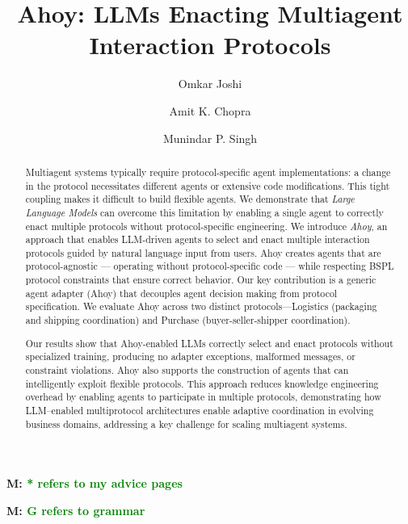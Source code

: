 \documentclass[runningheads]{llncs}
\newcommand{\mps}[1]{\textbf{M: \textcolor{green}{#1}}\newline}
\newcounter{mpscount}
\newcounter{akccount}
\DeclareRobustCommand{\mps}[1]{\stepcounter{mpscount}\textcolor{blue!60!black}{\textsf{MPS \thempscount: #1}}}
\DeclareRobustCommand{\akc}[1]{\stepcounter{akccount}\textcolor{red}{\textsf{AKC \theakccount: #1}}}
\newcommand{\ahoy}{Ahoy\xspace}
\begin{document}
%
\title{\ahoy: LLMs Enacting Multiagent Interaction Protocols}
%
\titlerunning{\ahoy}

\author{Omkar Joshi \and
Amit K. Chopra \and
Munindar P. Singh}
%


\maketitle

\mps{* refers to my advice pages}

\mps{G refers to grammar}

\begin{abstract}
Multiagent systems typically require protocol-specific agent implementations: a change in the protocol necessitates different agents or extensive code modifications.
This tight coupling makes it difficult to build flexible agents.
We demonstrate that \emph{Large Language Models} can overcome this limitation by enabling a single agent to correctly enact multiple protocols without protocol-specific engineering.
We introduce \emph{\ahoy}, an approach that enables LLM-driven agents to select and enact multiple interaction protocols guided by natural language input from users. 
\ahoy creates agents that are protocol-agnostic --- operating without protocol-specific code --- while respecting BSPL protocol constraints that ensure correct behavior.
Our key contribution is a generic agent adapter ({\ahoy}) that decouples agent decision making from protocol specification. 
We evaluate \ahoy across two distinct protocols---Logistics (packaging and shipping coordination) and Purchase (buyer-seller-shipper coordination).

Our results show that \ahoy-enabled LLMs correctly select and enact protocols without specialized training, producing no adapter exceptions, malformed messages, or constraint violations.
\ahoy also supports the construction of agents that can intelligently exploit flexible protocols.
This approach reduces knowledge engineering overhead by enabling agents to participate in multiple protocols, demonstrating how LLM--enabled multiprotocol architectures enable adaptive coordination in evolving business domains, addressing a key challenge for scaling multiagent systems. 


\end{abstract}
\end{document}
